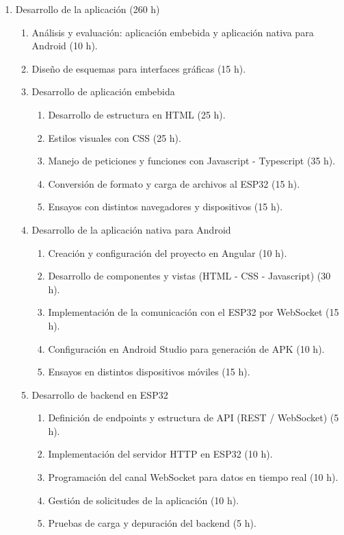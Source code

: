 \documentclass[
11pt, %
]{charter}
\begin{document}
\begin{enumerate}
\item Desarrollo de la aplicación (260 h)
	\begin{enumerate}
		\item Análisis y evaluación: aplicación embebida y aplicación nativa para Android (10 h).
		\item Diseño de esquemas para interfaces gráficas (15 h).
		\item Desarrollo de aplicación embebida
		\begin{enumerate}
			\item Desarrollo de estructura en HTML (25 h).
			\item Estilos visuales con CSS (25 h).
			\item Manejo de peticiones y funciones con Javascript - Typescript (35 h).
			\item Conversión de formato y carga de archivos al ESP32 (15 h).
			\item Ensayos con distintos navegadores y dispositivos (15 h).
		\end{enumerate}
		\item Desarrollo de la aplicación nativa para Android
		\begin{enumerate}
			\item Creación y configuración del proyecto en Angular (10 h).
			\item Desarrollo de componentes y vistas (HTML - CSS - Javascript) (30 h).
			\item Implementación de la comunicación con el ESP32 por WebSocket (15 h).
			\item Configuración en Android Studio para generación de APK (10 h).
			\item Ensayos en distintos dispositivos móviles (15 h).
		\end{enumerate}
		\item Desarrollo de backend en ESP32
		\begin{enumerate}
			\item Definición de endpoints y estructura de API (REST / WebSocket) (5 h).
			\item Implementación del servidor HTTP en ESP32 (10 h).
			\item Programación del canal WebSocket para datos en tiempo real (10 h).
			\item Gestión de solicitudes de la aplicación (10 h).
			\item Pruebas de carga y depuración del backend (5 h).
		\end{enumerate}	
	\end{enumerate}

\end{enumerate}
\end{document}
